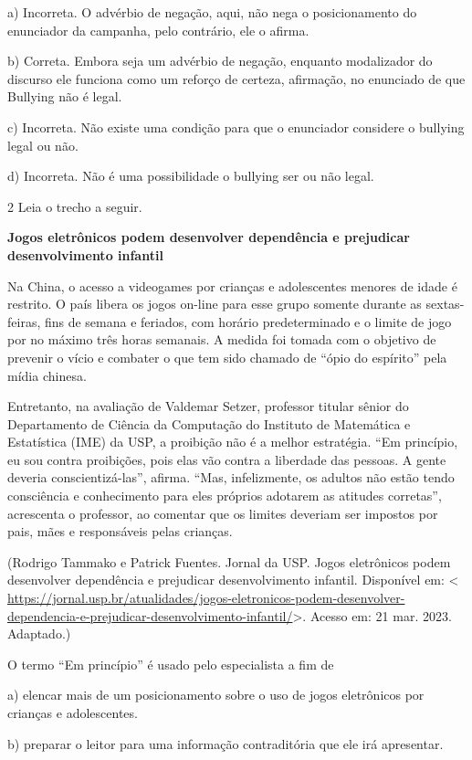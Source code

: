 a) Incorreta. O advérbio de negação, aqui, não nega o posicionamento do
enunciador da campanha, pelo contrário, ele o afirma.

b) Correta. Embora seja um advérbio de negação, enquanto modalizador do
discurso ele funciona como um reforço de certeza, afirmação, no
enunciado de que Bullying não é legal.

c) Incorreta. Não existe uma condição para que o enunciador considere o
bullying legal ou não.

d) Incorreta. Não é uma possibilidade o bullying ser ou não legal.

\num{2} Leia o trecho a seguir.

\textbf{Jogos eletrônicos podem desenvolver dependência e prejudicar
desenvolvimento infantil}

Na China, o acesso a videogames por crianças e adolescentes menores de
idade é restrito. O país libera os jogos on-line para esse grupo somente
durante as sextas-feiras, fins de semana e feriados, com horário
predeterminado e o limite de jogo por no máximo três horas semanais. A
medida foi tomada com o objetivo de prevenir o vício e combater o que
tem sido chamado de ``ópio do espírito'' pela mídia chinesa.

Entretanto, na avaliação de Valdemar Setzer, professor titular sênior do
Departamento de Ciência da Computação do Instituto de Matemática e
Estatística (IME) da USP, a proibição não é a melhor estratégia. ``Em
princípio, eu sou contra proibições, pois elas vão contra a liberdade
das pessoas. A gente deveria conscientizá-las'', afirma. ``Mas,
infelizmente, os adultos não estão tendo consciência e conhecimento para
eles próprios adotarem as atitudes corretas'', acrescenta o professor,
ao comentar que os limites deveriam ser impostos por pais, mães e
responsáveis pelas crianças.

(Rodrigo Tammako e Patrick Fuentes. Jornal da USP. Jogos eletrônicos
podem desenvolver dependência e prejudicar desenvolvimento infantil.
Disponível em: \textless{}
\url{https://jornal.usp.br/atualidades/jogos-eletronicos-podem-desenvolver-dependencia-e-prejudicar-desenvolvimento-infantil/}\textgreater.
Acesso em: 21 mar. 2023. Adaptado.)

O termo ``Em princípio'' é usado pelo especialista a fim de

a) elencar mais de um posicionamento sobre o uso de jogos eletrônicos
por crianças e adolescentes.

b) preparar o leitor para uma informação contraditória que ele irá
apresentar.

